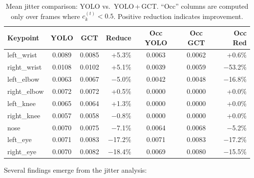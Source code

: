 \documentclass{article}
\begin{document}
\begin{table}[htbp]
  \centering
  \caption{Mean jitter comparison: YOLO vs.\ YOLO\,+\,GCT. ``Occ''
           columns are computed only over frames where
           $c_k^{(t)} < 0.5$. Positive reduction indicates improvement.}
  \label{tab:jitter}
  \footnotesize
  \begin{tabular}{@{}l cc r cc r@{}}
    \toprule
    Keypoint
      & YOLO   & GCT    & Reduce
      & Occ YOLO & Occ GCT & Occ Red \\
    \midrule
    left\_wrist     & 0.0089 & 0.0085 & +5.3\%
                    & 0.0063 & 0.0062 & +0.6\% \\
    right\_wrist    & 0.0108 & 0.0102 & +5.1\%
                    & 0.0039 & 0.0059 & $-$53.2\% \\
    left\_elbow     & 0.0063 & 0.0067 & $-$5.0\%
                    & 0.0042 & 0.0048 & $-$16.8\% \\
    right\_elbow    & 0.0072 & 0.0072 & +0.5\%
                    & 0.0000 & 0.0000 & +0.0\% \\
    left\_knee      & 0.0065 & 0.0064 & +1.3\%
                    & 0.0000 & 0.0000 & +0.0\% \\
    right\_knee     & 0.0057 & 0.0058 & $-$0.8\%
                    & 0.0000 & 0.0000 & +0.0\% \\
    nose            & 0.0070 & 0.0075 & $-$7.1\%
                    & 0.0064 & 0.0068 & $-$5.2\% \\
    left\_eye       & 0.0071 & 0.0083 & $-$17.2\%
                    & 0.0071 & 0.0083 & $-$17.2\% \\
    right\_eye      & 0.0070 & 0.0082 & $-$18.4\%
                    & 0.0069 & 0.0080 & $-$15.5\% \\
    \bottomrule
  \end{tabular}
\end{table}

Several findings emerge from the jitter analysis:
\end{document}
